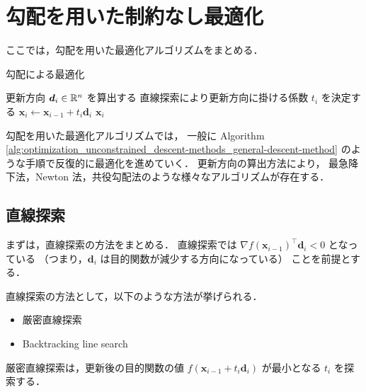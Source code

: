 %

\chapter{勾配を用いた制約なし最適化}

ここでは，勾配を用いた最適化アルゴリズムをまとめる．

\begin{algorithm}[tp]
    \caption{勾配による最適化}
    \label{alg:optimization_unconstrained_descent-methods_general-descent-method}
    \begin{algorithmic}
                \State 更新方向 $\bm{d}_i \in \mathbb{R}^n$ を算出する
                \State 直線探索により更新方向に掛ける係数 $t_i$ を決定する
                \State $\bm{x}_i \gets \bm{x}_{i-1} + t_i \bm{d}_i$
                    \State \Return $\bm{x}_i$
                \EndIf
            \EndFor
        \EndProcedure
    \end{algorithmic}
\end{algorithm}

勾配を用いた最適化アルゴリズムでは，
一般に
Algorithm \ref{alg:optimization_unconstrained_descent-methods_general-descent-method}
のような手順で反復的に最適化を進めていく．
更新方向の算出方法により，
最急降下法，Newton 法，共役勾配法のような様々なアルゴリズムが存在する．

\section{直線探索}

まずは，直線探索の方法をまとめる．
直線探索では
$\nabla f(\bm{x}_{i-1})^\top \bm{d}_i < 0$ となっている
（つまり，$\bm{d}_i$ は目的関数が減少する方向になっている）
ことを前提とする．

直線探索の方法として，以下のような方法が挙げられる．

\begin{itemize}
    \item 厳密直線探索
    \item Backtracking line search
\end{itemize}

厳密直線探索は，更新後の目的関数の値
$f(\bm{x}_{i-1} + t_i \bm{d}_i)$
が最小となる $t_i$ を探索する．


